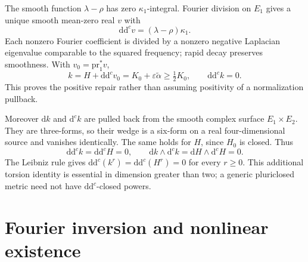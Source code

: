 \documentclass[11pt]{article}
\newcommand{\ddc}{\mathrm{d}\mathrm{d}^c}
\newcommand{\dc}{\mathrm{d}^c}
\newcommand{\eps}{\varepsilon}
\begin{document}
The smooth function $\lambda-\rho$ has zero $\kappa_1$-integral.
Fourier division on $E_1$ gives a unique smooth mean-zero real $v$ with
\[
 \ddc v=(\lambda-\rho)\kappa_1.
\]
Each nonzero Fourier coefficient is divided by a nonzero negative
Laplacian eigenvalue comparable to the squared frequency; rapid decay
preserves smoothness. With $v_0=\mathrm{pr}_1^*v$,
\begin{equation}\label{eq:repaired}
 k=H+\ddc v_0=K_0+\eps\widetilde\alpha\ge\tfrac12K_0,
 \qquad \ddc k=0.
\end{equation}
This proves the positive repair rather than assuming positivity of a
normalization pullback.

Moreover $\mathrm{d}k$ and $\dc k$ are pulled back from the smooth complex
surface $E_1\times E_2$. They are three-forms, so their wedge is a
six-form on a real four-dimensional source and vanishes identically.
The same holds for $H$, since $H_0$ is closed. Thus
\[
 \ddc k=\ddc H=0,\qquad
 \mathrm{d}k\wedge\dc k=\mathrm{d}H\wedge\dc H=0.
\]
The Leibniz rule gives $\ddc(k^r)=\ddc(H^r)=0$ for every $r\ge0$.
This additional torsion identity is essential in dimension greater than two;
a generic pluriclosed metric need not have $\ddc$-closed powers.

\section{Fourier inversion and nonlinear existence}\label{sec:existence}
\end{document}
